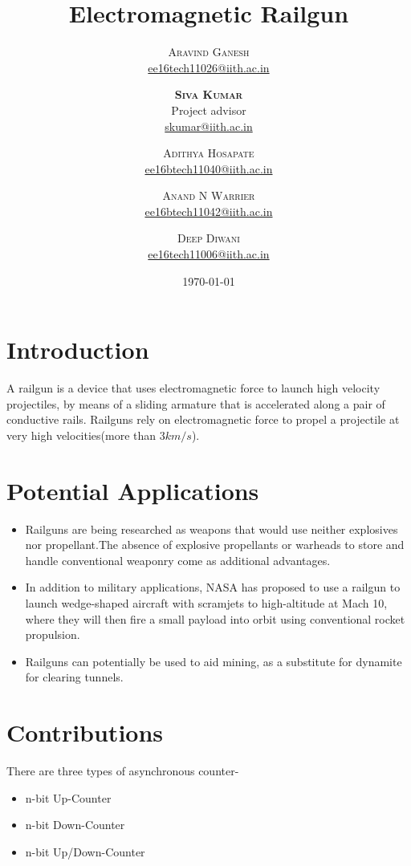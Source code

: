 \documentclass[twoside,twocolumn]{article}
\title{Electromagnetic Railgun} %
\author{%
\textsc{Aravind Ganesh}\\[1ex] %
\normalsize \href{mailto:ee16tech11026@iith.ac.in}{ee16tech11026@iith.ac.in}
\and %
\textsc{\textbf{Siva Kumar}}\\
 Project advisor\\
\normalsize \href{mailto:ee16btech11006@iith.ac.in}{skumar@iith.ac.in} %
\and %
\textsc{Adithya Hosapate}\\[1ex] %
\normalsize \href{mailto:ee16btech11040@iith.ac.in}{ee16btech11040@iith.ac.in} %
\and %
\textsc{Anand N Warrier}\\[1ex] %
\normalsize \href{mailto:ee16btech11042@iith.ac.in}{ee16btech11042@iith.ac.in} %
\and
\textsc{Deep Diwani}\\[1ex] %
\normalsize \href{mailto:ee16tech11006@iith.ac.in}{ee16tech11006@iith.ac.in}
}
\date{\today} %
\begin{document}
\maketitle


\section{Introduction}

	A railgun is a device that uses electromagnetic force to launch high velocity projectiles, by means of a sliding armature that is accelerated along a pair of conductive rails. Railguns rely on electromagnetic force to propel a projectile at very high velocities(more than $3 km/s$).


\section{Potential Applications}
\begin{itemize}

\item Railguns are being researched as weapons that would use neither explosives nor propellant.The absence of explosive propellants or warheads to store and handle conventional weaponry come as additional advantages.

\item In addition to military applications, NASA has proposed to use a railgun to launch wedge-shaped aircraft with scramjets to high-altitude at Mach 10, where they will then fire a small payload into orbit using conventional rocket propulsion.

\item Railguns can potentially be used to aid mining, as a substitute for dynamite for clearing tunnels. 

\end{itemize}


\section{Contributions}

There are three types of asynchronous counter-
\begin{itemize}
	\item n-bit Up-Counter
	\item n-bit Down-Counter
	\item n-bit Up/Down-Counter 
\end{itemize}
\end{document}
